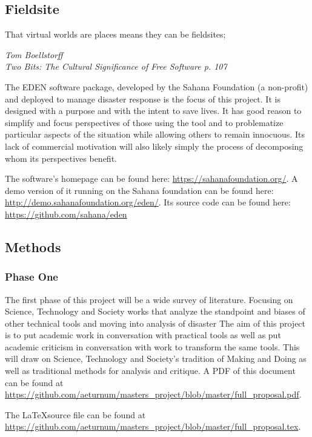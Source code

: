 \documentclass[a4paper,man,natbib]{apa6}
\begin{document}
   \subsection*{Fieldsite}
   \epigraph{That virtual worlds are places means they can be fieldsites;}{\textit{Tom Boellstorff \\ Two Bits: The Cultural Significance of Free Software p. 107}}

   The EDEN software package, developed by the Sahana Foundation (a non-profit) and deployed to manage disaster response is the focus of this project. It is designed with a purpose and with the intent to save lives. It has good reason to simplify and focus perspectives of those using the tool and to problematize particular aspects of the situation while allowing others to remain innocuous. Its lack of commercial motivation will also likely simply the process of decomposing whom its perspectives benefit.

   The software's homepage can be found here: \url{https://sahanafoundation.org/}. A demo version of it running on the Sahana foundation can be found here: \url{http://demo.sahanafoundation.org/eden/}. Its source code can be found here: \url{https://github.com/sahana/eden}

   \subsection*{Methods}
   \subsubsection*{Phase One}
   The first phase of this project will be a wide survey of literature. Focusing on Science, Technology and Society works that analyze the standpoint and biases of other technical tools and moving into analysis of disaster 
   The aim of this project is to put academic work in conversation with practical tools as well as put academic criticism in conversation with work to  transform the same tools. This will draw on Science, Technology and Society's tradition of Making and Doing as well as traditional methods for analysis and critique.
   A PDF of this document can be found at \url{https://github.com/aeturnum/masters_project/blob/master/full_proposal.pdf}.

   The \LaTeX source file can be found at \url{https://github.com/aeturnum/masters_project/blob/master/full_proposal.tex}.
   
\end{document}
